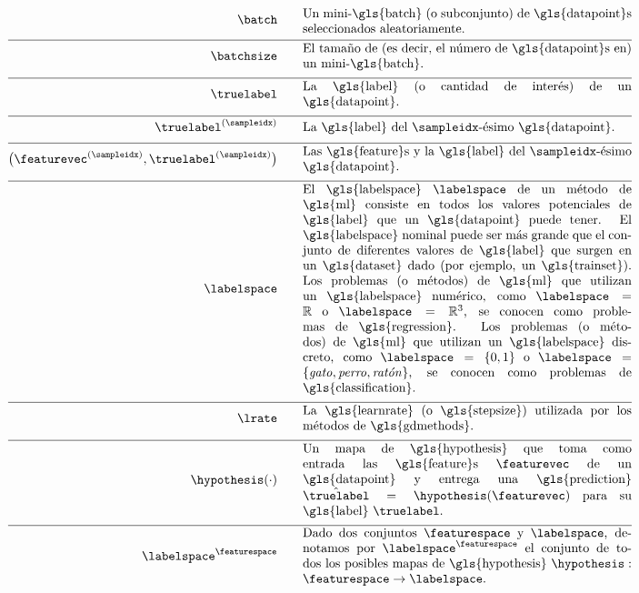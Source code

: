 \begin{align}
	\batch \quad\quad &\parbox{.75\textwidth}{Un mini-\gls{batch} (o subconjunto) de \gls{datapoint}s seleccionados aleatoriamente.}\nonumber \\[2mm] \hline \nonumber\\[-5mm]
	\batchsize \quad\quad &\parbox{.75\textwidth}{El tamaño de (es decir, el número de \gls{datapoint}s en) un mini-\gls{batch}.}\nonumber \\[2mm] \hline \nonumber\\[-5mm]
	\truelabel \quad\quad &\parbox{.75\textwidth}{La \gls{label} (o cantidad de interés) de un \gls{datapoint}.} \nonumber \\[2mm] \hline \nonumber\\[-5mm]
	\truelabel^{(\sampleidx)} \quad\quad &\parbox{.75\textwidth}{La \gls{label} del $\sampleidx$-ésimo \gls{datapoint}.} \nonumber \\[2mm] \hline \nonumber\\[-5mm]
	\big(\featurevec^{(\sampleidx)},\truelabel^{(\sampleidx)}\big)  \quad\quad &\parbox{.75\textwidth}{Las \gls{feature}s y la \gls{label} del $\sampleidx$-ésimo \gls{datapoint}.}\nonumber \\[2mm] \hline \nonumber\\[-5mm]
	\labelspace  \quad\quad & \parbox{.75\textwidth}{El \gls{labelspace} $\labelspace$ de un método de \gls{ml} 
		consiste en todos los valores potenciales de \gls{label} que un \gls{datapoint} puede tener. 
		El \gls{labelspace} nominal puede ser más grande que el conjunto de diferentes valores de \gls{label} que surgen en un \gls{dataset} dado (por ejemplo, un \gls{trainset}). 
		Los problemas (o métodos) de \gls{ml} que utilizan un \gls{labelspace} numérico, como $\labelspace=\mathbb{R}$ 
		o $\labelspace=\mathbb{R}^{3}$, se conocen como problemas de \gls{regression}. 
		Los problemas (o métodos) de \gls{ml} que utilizan un \gls{labelspace} discreto, como $\labelspace=\{0,1\}$ 
		o $\labelspace=\{\mbox{\emph{gato}},\mbox{\emph{perro}},\mbox{\emph{ratón}}\}$, se conocen como problemas de \gls{classification}.}  \nonumber \\[2mm] \hline \nonumber\\[-5mm]
	\lrate  \quad\quad & \parbox{.75\textwidth}{La \gls{learnrate} (o \gls{stepsize}) utilizada por los métodos de \gls{gdmethods}.}  \nonumber \\[2mm] \hline \nonumber\\[-5mm]
	\hypothesis(\cdot)  \quad\quad &\parbox{.75\textwidth}{Un mapa de \gls{hypothesis} que toma como entrada las \gls{feature}s $\featurevec$ de un \gls{datapoint} 
		y entrega una \gls{prediction} $\hat{\truelabel}=\hypothesis(\featurevec)$ para su \gls{label} $\truelabel$.}  	 \nonumber \\[2mm] \hline \nonumber\\[-5mm]
	 \labelspace^{\featurespace} \quad\quad & \parbox{.75\textwidth}{Dado dos conjuntos $\featurespace$ y $\labelspace$, denotamos por $\labelspace^{\featurespace}$ el conjunto de todos los posibles mapas de \gls{hypothesis} $\hypothesis: \featurespace \rightarrow \labelspace$.} 	 \nonumber 
\end{align}                  


